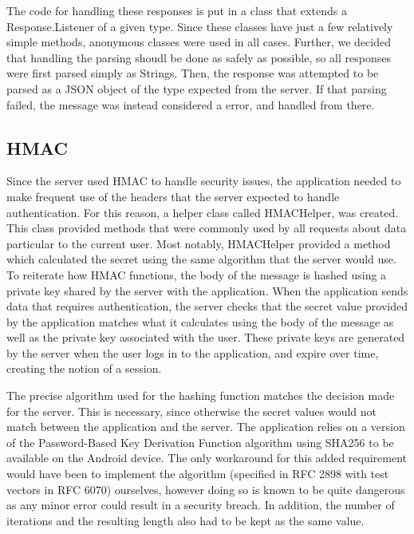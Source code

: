 \documentclass[12pt]{report}
\begin{document}
The code for handling these responses is put in a class that extends a Response.Listener of a given type. Since these
classes have just a few relatively simple methods, anonymous classes were used in all cases. Further, we decided that
handling the parsing shoudl be done as safely as possible, so all responses were first parsed simply as Strings. Then,
the response was attempted to be parsed as a JSON object of the type expected from the server. If that parsing failed,
the message was instead considered a error, and handled from there.

\subsection{HMAC}

Since the server used HMAC to handle security issues, the application needed to make frequent use of the headers that
the server expected to handle authentication. For this reason, a helper class called HMACHelper, was created. This
class provided methods that were commonly used by all requests about data particular to the current user. Most notably,
HMACHelper provided a method which calculated the secret using the same algorithm that the server would use. To
reiterate how HMAC functions, the body of the message is hashed using a private key shared by the server with the
application. When the application sends data that requires authentication, the server checks that the secret value
provided by the application matches what it calculates using the body of the message as well as the private key
associated with the user. These private keys are generated by the server when the user logs in to the application,
and expire over time, creating the notion of a session.

The precise algorithm used for the hashing function matches the decision made for the server. This is necessary, since
otherwise the secret values would not match between the application and the server. The application relies on a version
of the Password-Based Key Derivation Function algorithm using SHA256 to be available on the Android device. The only
workaround for this added requirement would have been to implement the algorithm (specified in RFC 2898 with test
vectors in RFC 6070) ourselves, however doing so is known to be quite dangerous as any minor error could result in a
security breach. In addition, the number of iterations and the resulting length also had to be kept as the same value.

\end{document}
